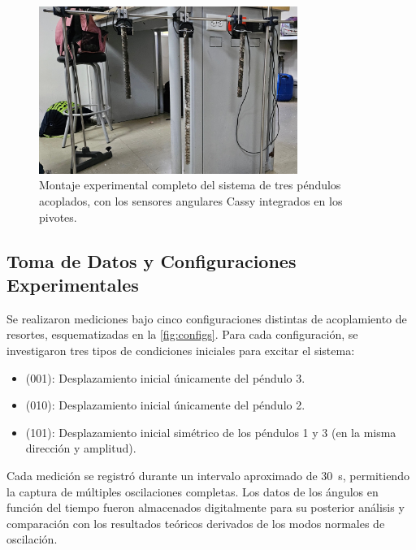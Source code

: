 \begin{figure}[htbp!]
  \centering
  \includegraphics[width=0.75\textwidth]{Figures/set-up.jpeg}
  \caption{Montaje experimental completo del sistema de tres
    p\'endulos acoplados, con los sensores angulares Cassy
  integrados en los pivotes.}
  \label{fig:montaje}
\end{figure}

\subsection*{Toma de Datos y Configuraciones Experimentales}

Se realizaron mediciones bajo cinco configuraciones distintas de
acoplamiento de resortes, esquematizadas en la \cref{fig:configs}.
Para cada configuraci\'on, se investigaron tres tipos de
condiciones iniciales para excitar el sistema:
\begin{itemize}
  \item (001): Desplazamiento inicial \'unicamente del p\'endulo 3.
  \item (010): Desplazamiento inicial \'unicamente del p\'endulo 2.
  \item (101): Desplazamiento inicial sim\'etrico de los p\'endulos
    1 y 3 (en la misma direcci\'on y amplitud).
\end{itemize}
Cada medici\'on se registr\'o durante un intervalo aproximado de
\qty{30}{\second}, permitiendo la captura de m\'ultiples
oscilaciones completas. Los datos de los \'angulos en funci\'on
del tiempo fueron almacenados digitalmente para su posterior
an\'alisis y comparaci\'on con los resultados te\'oricos derivados
de los modos normales de oscilaci\'on.

